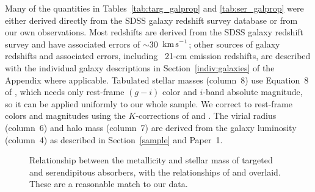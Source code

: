 \documentclass[twocolumn,twocolappendix,tighten,times]{aastex6}
\newcommand{\HI}{\ion{H}{1}}
\newcommand{\kms}{\ensuremath{{\rm km\,s}^{-1}}}
\begin{document}
Many of the quantities in Tables~\ref{tab:targ_galprop} and 
\ref{tab:ser_galprop} were either derived directly from the SDSS galaxy 
redshift survey database \citep[DR12;][]{alam15} or from our own observations. 
Most redshifts are derived from the SDSS galaxy redshift survey and have associated 
errors of $\sim30$~\kms; other sources of galaxy redshifts and associated errors, 
including \HI\ 21-cm emission redshifts, are described with the individual galaxy 
descriptions in Section~\ref{indiv:galaxies} of the Appendix where applicable. 
Tabulated stellar masses (column~8) use Equation~8 of \citet{taylor11}, 
which needs only rest-frame $(g-i)$ color and $i$-band absolute magnitude, so it 
can be applied uniformly to our whole sample. We correct to rest-frame colors and 
magnitudes using the $K$-corrections of \citet{chilingarian10} and 
\citet{chilingarian12}. The virial radius (column~6) and halo mass (column~7) are 
derived from the galaxy luminosity (column~4) as described in Section~\ref{sample} 
and Paper~1.





\clearpage

\begin{figure}[!t]
\caption{Relationship between the metallicity and stellar mass of targeted and serendipitous absorbers, with the relationships of \citet[dashed line]{tremonti04} and \citet[dotted line]{lee06} overlaid. These are a reasonable match to our data.
\label{fig:MZ}}
\end{figure}
\end{document}
